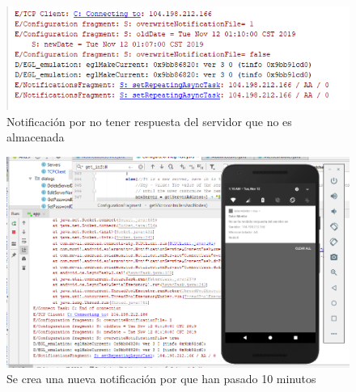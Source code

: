 \begin{figure}[H]
	\centering
	\includegraphics[scale=.7]{Capitulo5/images/muestra8.png}
	\caption{Notificación por no tener respuesta del servidor que no es almacenada}	
	\label{fig:muestra 8}
\end{figure} 

\begin{figure}[H]
	\centering
	\includegraphics[scale=.7]{Capitulo5/images/muestra9.png}
	\caption{Se crea una nueva notificación por que han pasado 10 minutos}	
	\label{fig:muestra 9}
\end{figure} 


